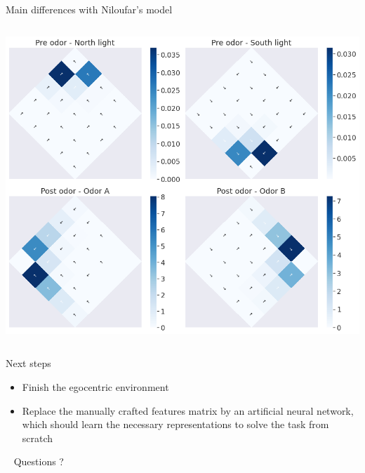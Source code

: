 \documentclass[bigger]{beamer}
\begin{document}
\begin{frame}[label={sec:org7f179d0}]{Main differences with Niloufar's model}
\begin{columns}
\begin{column}{0.3\columnwidth}
\begin{center}
\includegraphics[width=\textwidth]{img/q-learning_allo_best_actions_maps.png}
\end{center}
\end{column}
\end{columns}
\end{frame}
\begin{frame}[<+->][label={sec:org56f0e23}]{Next steps}
\begin{itemize}
\item Finish the egocentric environment
\item Replace the manually crafted features matrix by an artificial neural network, which should learn the necessary representations to solve the task from scratch
\end{itemize}
\end{frame}
\begin{frame}[label={sec:org2220530},standout]{~}
Questions ?
\end{frame}
\end{document}
